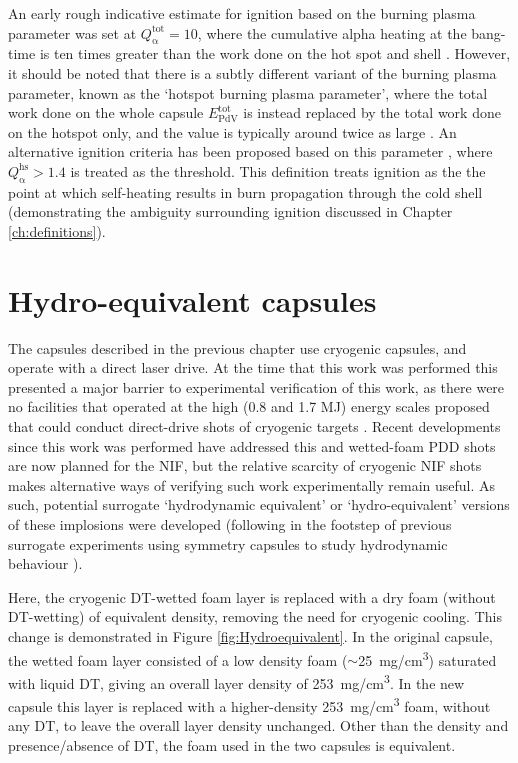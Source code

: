 An early rough indicative estimate for ignition based on the burning plasma parameter was set at $Q^\mathrm{{tot}}_{\mathrm{\alpha}} = 10$, where the cumulative alpha heating at the bang-time is ten times greater than the work done on the hot spot and shell \cite{Betti2011}. However, it should be noted that there is a subtly different variant of the burning plasma parameter, known as the `hotspot burning plasma parameter', where the total work done on the whole capsule $E^\mathrm{{tot}}_{\mathrm{PdV}}$ is instead replaced by the total work done on the hotspot only, and the value is typically around twice as large \cite{Betti2015}. An alternative ignition criteria has been proposed based on this parameter \cite{Christopherson2020}, where $Q^\mathrm{{hs}}_{\mathrm{\alpha}} > 1.4$ is treated as the threshold. This definition treats ignition as the the point at which self-heating results in burn propagation through the cold shell (demonstrating the ambiguity surrounding ignition discussed in Chapter \ref{ch:definitions}).

\section{Hydro-equivalent capsules} \label{sec:Hydroequivalent}
The capsules described in the previous chapter use cryogenic capsules, and operate with a direct laser drive. At the time that this work was performed this presented a major barrier to experimental verification of this work, as there were no facilities that operated at the high (0.8 and 1.7 MJ) energy scales proposed that could conduct direct-drive shots of cryogenic targets \cite{Hohenberger2015}. Recent developments since this work was performed have addressed this and wetted-foam PDD shots are now planned for the NIF, but the relative scarcity of cryogenic NIF shots makes alternative ways of verifying such work experimentally remain useful. As such, potential surrogate `hydrodynamic equivalent' or `hydro-equivalent' versions of these implosions were developed (following in the footstep of previous surrogate experiments using symmetry capsules to study hydrodynamic behaviour \cite{Weber2016}). 

Here, the cryogenic DT-wetted foam layer is replaced with a dry foam (without DT-wetting) of equivalent density, removing the need for cryogenic cooling. This change is demonstrated in Figure \ref{fig:Hydroequivalent}. In the original capsule, the wetted foam layer consisted of a low density foam ($\sim$25~\si[per-mode=symbol]{\milli\gram\per\centi\meter\cubed}) saturated with liquid DT, giving an overall layer density of 253~\si[per-mode=symbol]{\milli\gram\per\centi\meter\cubed}. In the new capsule this layer is replaced with a higher-density 253~\si[per-mode=symbol]{\milli\gram\per\centi\meter\cubed} foam, without any DT, to leave the overall layer density  unchanged. Other than the density and presence/absence of DT, the foam used in the two capsules is equivalent.

